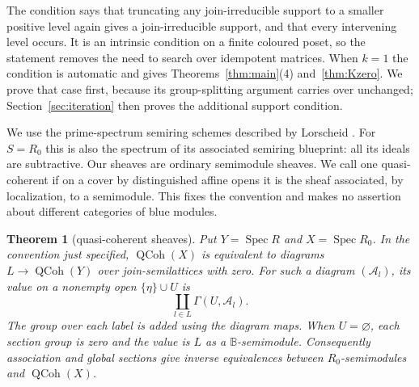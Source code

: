 \documentclass[11pt]{amsart}
\newcommand{\B}{\mathbb B}
\newcommand{\Qcoh}{\operatorname{QCoh}}
\DeclareMathOperator{\Spec}{Spec}
\newtheorem{theorem}{Theorem}[section]
\theoremstyle{definition}
\theoremstyle{remark}
\begin{document}
The condition says that truncating any join-irreducible support to a smaller positive level again gives a join-irreducible support, and that every intervening level occurs. It is an intrinsic condition on a finite coloured poset, so the statement removes the need to search over idempotent matrices. When $k=1$ the condition is automatic and gives Theorems~\ref{thm:main}(4) and~\ref{thm:Kzero}. We prove that case first, because its group-splitting argument carries over unchanged; Section~\ref{sec:iteration} then proves the additional support condition.

We use the prime-spectrum semiring schemes described by Lorscheid \cite[\S1.1 and \S1.4.1]{Lorscheid2026}. For $S=R_0$ this is also the spectrum of its associated semiring blueprint: all its ideals are subtractive. Our sheaves are ordinary semimodule sheaves. We call one quasi-coherent if on a cover by distinguished affine opens it is the sheaf associated, by localization, to a semimodule. This fixes the convention and makes no assertion about different categories of blue modules.

\begin{theorem}[quasi-coherent sheaves]\label{thm:QC}
Put $Y=\Spec R$ and $X=\Spec R_0$. In the convention just specified, $\Qcoh(X)$ is equivalent to diagrams $L\to\Qcoh(Y)$ over join-semilattices with zero. For such a diagram $(\mathcal A_l)$, its value on a nonempty open $\{\eta\}\cup U$ is
\begin{equation}\label{eq:sheaf}
 \coprod_{l\in L}\Gamma(U,\mathcal A_l).
\end{equation}
The group over each label is added using the diagram maps. When $U=\varnothing$, each section group is zero and the value is $L$ as a $\B$-semimodule. Consequently association and global sections give inverse equivalences between $R_0$-semimodules and $\Qcoh(X)$.
\end{theorem}


















\end{document}
